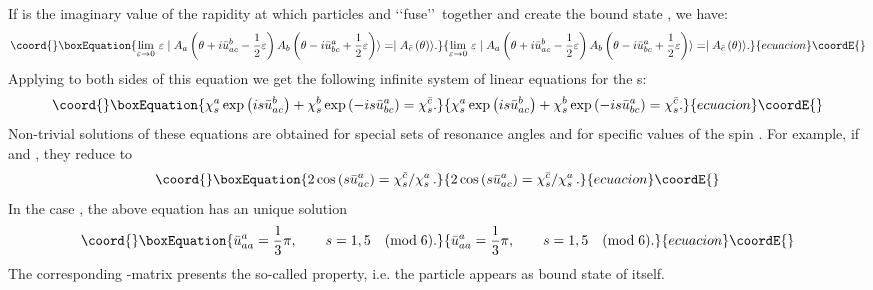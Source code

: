 \documentclass[a4paper,12pt]{report}
\begin{document}
If \coordHE{} is the imaginary value of the rapidity at which particles \coordHE{} and \coordHE{} \lq\lq fuse\rq\rq\,
together and create the bound state \coordHE{}, we have:
\begin{equation}\coord{}\boxEquation{
\lim_{\varepsilon\rightarrow 0}\,\varepsilon\mid
A_{a}\left(\theta+i\bar{u}_{ac}^{b}-\frac{1}{2}\varepsilon\right)A_{b}\left(\theta-i\bar{u}_{bc}^{a}+\frac{1}{2}\varepsilon\right)\rangle
=\mid A_{\bar{c}}\left(\theta\right)\rangle .
}{
\lim_{\varepsilon\rightarrow 0}\,\varepsilon\mid
A_{a}\left(\theta+i\bar{u}_{ac}^{b}-\frac{1}{2}\varepsilon\right)A_{b}\left(\theta-i\bar{u}_{bc}^{a}+\frac{1}{2}\varepsilon\right)\rangle
=\mid A_{\bar{c}}\left(\theta\right)\rangle .
}{ecuacion}\coordE{}\end{equation}
Applying \coordHE{} to both sides of this equation we get the following infinite system of linear equations for the
\coordHE{}s:
\begin{equation}\coord{}\boxEquation{\label{consisteq}
\chi_{s}^{a}\exp\left(is\bar{u}_{ac}^{b}\right)+\chi_{s}^{b}\exp\left(-is\bar{u}_{bc}^{a}\right)=\chi_{s}^{\bar{c}}.
}{\chi_{s}^{a}\exp\left(is\bar{u}_{ac}^{b}\right)+\chi_{s}^{b}\exp\left(-is\bar{u}_{bc}^{a}\right)=\chi_{s}^{\bar{c}}.
}{ecuacion}\coordE{}\end{equation}
Non-trivial solutions of these equations are obtained for special sets of resonance angles \coordHE{} and for
specific values of the spin \coordHE{}. For example, if \coordHE{} and \coordHE{}, they reduce to
\begin{equation}\coord{}\boxEquation{
2\cos\left(s\bar{u}_{ac}^{a}\right)=\chi_{s}^{\bar{c}}/\chi_{s}^{a}\,.
}{
2\cos\left(s\bar{u}_{ac}^{a}\right)=\chi_{s}^{\bar{c}}/\chi_{s}^{a}\,.
}{ecuacion}\coordE{}\end{equation}
In the case \coordHE{}, the above equation has an unique solution
\begin{equation}\coord{}\boxEquation{ \label{phi3}
\bar{u}_{aa}^{a}=\frac{1}{3}\pi, \qquad s=1,5 \quad (\textrm{mod}\;6).
}{ \bar{u}_{aa}^{a}=\frac{1}{3}\pi, \qquad s=1,5 \quad (\textrm{mod}\;6).
}{ecuacion}\coordE{}\end{equation}
The corresponding \coordHE{}-matrix presents the so-called \coordHE{} property, i.e. the particle \coordHE{} appears as
bound state of itself.
\end{document}
